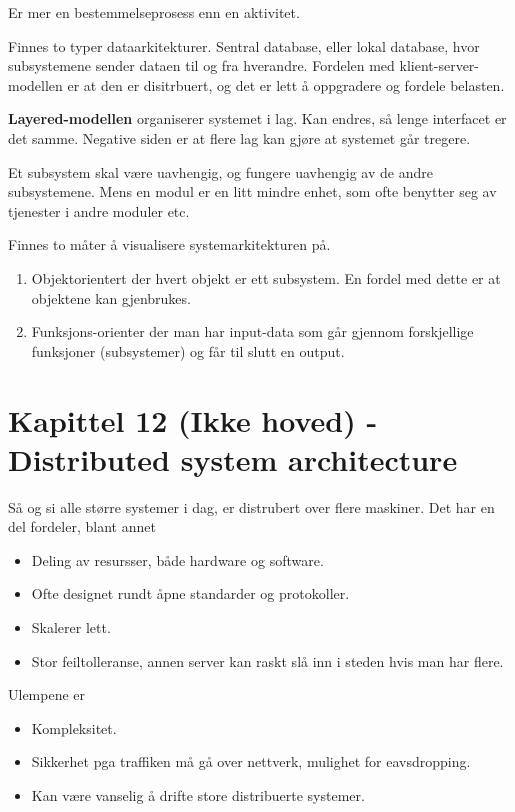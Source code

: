 \documentclass[11pt]{article}
\begin{document}
  Er mer en bestemmelseprosess enn en aktivitet. 

  Finnes to typer dataarkitekturer. Sentral database, eller lokal database, hvor subsystemene sender dataen til og fra hverandre. Fordelen med klient-server-modellen er at den er disitrbuert, og det er lett å oppgradere og fordele belasten.

  \textbf{Layered-modellen} organiserer systemet i lag. Kan endres, så lenge interfacet er det samme. Negative siden er at flere lag kan gjøre at systemet går tregere.

  Et subsystem skal være uavhengig, og fungere uavhengig av de andre subsystemene. Mens en modul er en litt mindre enhet, som ofte benytter seg av tjenester i andre moduler etc.

  Finnes to måter å visualisere systemarkitekturen på.

\begin{enumerate}
\item Objektorientert
     der hvert objekt er ett subsystem. En fordel med dette er at objektene kan gjenbrukes.
\item Funksjons-orienter 
     der man har input-data som går gjennom forskjellige funksjoner (subsystemer) og får til slutt en output.
\end{enumerate}
\section{Kapittel 12 (Ikke hoved) - Distributed system architecture}
\label{sec-13}

  Så og si alle større systemer i dag, er distrubert over flere maskiner. Det har en del fordeler, blant annet

\begin{itemize}
\item Deling av resursser, både hardware og software.
\item Ofte designet rundt åpne standarder og protokoller.
\item Skalerer lett.
\item Stor feiltolleranse, annen server kan raskt slå inn i steden hvis man har flere.
\end{itemize}

  Ulempene er

\begin{itemize}
\item Kompleksitet.
\item Sikkerhet pga traffiken må gå over nettverk, mulighet for eavsdropping.
\item Kan være vanselig å drifte store distribuerte systemer.
\end{itemize}
\end{document}
